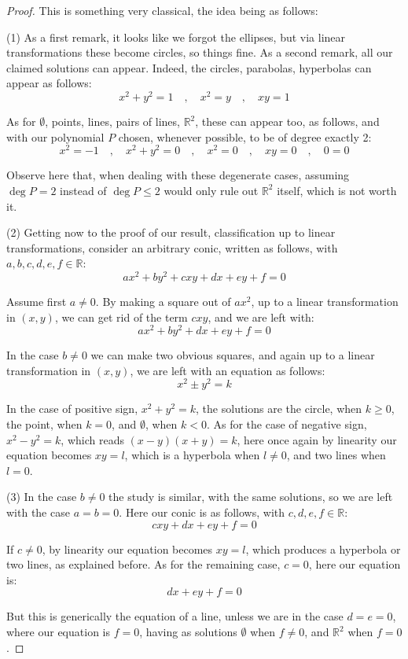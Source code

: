 \documentclass[12pt]{amsbook}
\begin{document}
\begin{proof}
This is something very classical, the idea being as follows:

\medskip

(1) As a first remark, it looks like we forgot the ellipses, but via linear transformations these become circles, so things fine. As a second remark, all our claimed solutions can appear. Indeed, the circles, parabolas, hyperbolas can appear as follows:
$$x^2+y^2=1\quad,\quad x^2=y\quad,\quad xy=1$$

As for $\emptyset$, points, lines, pairs of lines, $\mathbb R^2$, these can appear too, as follows, and with our polynomial $P$ chosen, whenever possible, to be of degree exactly 2:
$$x^2=-1\quad,\quad x^2+y^2=0\quad,\quad x^2=0\quad,\quad xy=0\quad,\quad 0=0$$

Observe here that, when dealing with these degenerate cases, assuming $\deg P=2$ instead of $\deg P\leq 2$ would only rule out $\mathbb R^2$ itself, which is not worth it. 

\medskip

(2) Getting now to the proof of our result, classification up to linear transformations, consider an arbitrary conic, written as follows, with $a,b,c,d,e,f\in\mathbb R$:
$$ax^2+by^2+cxy+dx+ey+f=0$$

Assume first $a\neq0$. By making a square out of $ax^2$, up to a linear transformation in $(x,y)$, we can get rid of the term $cxy$, and we are left with:
$$ax^2+by^2+dx+ey+f=0$$

In the case $b\neq0$ we can make two obvious squares, and again up to a linear transformation in $(x,y)$, we are left with an equation as follows:
$$x^2\pm y^2=k$$

In the case of positive sign, $x^2+y^2=k$, the solutions are the circle, when $k\geq0$, the point, when $k=0$, and $\emptyset$, when $k<0$. As for the case of negative sign, $x^2-y^2=k$, which reads $(x-y)(x+y)=k$, here once again by linearity our equation becomes $xy=l$, which is a hyperbola when $l\neq0$, and two lines when $l=0$.

\medskip

(3) In the case $b\neq0$ the study is similar, with the same solutions, so we are left with the case $a=b=0$. Here our conic is as follows, with $c,d,e,f\in\mathbb R$:
$$cxy+dx+ey+f=0$$

If $c\neq 0$, by linearity our equation becomes $xy=l$, which produces a hyperbola or two lines, as explained before. As for the remaining case, $c=0$, here our equation is:
$$dx+ey+f=0$$

But this is generically the equation of a line, unless we are in the case $d=e=0$, where our equation is $f=0$, having as solutions $\emptyset$ when $f\neq0$, and $\mathbb R^2$ when $f=0$.
\end{proof}
\end{document}
